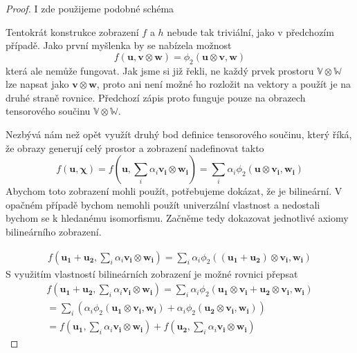 \documentclass[a5paper,12pt]{amsbook}
\theoremstyle{definition}
\newcommand{\myvec}[1]{\mathbf{#1}}
\newcommand{\myspace}[1]{\mathbb{#1}}
\begin{document}
\begin{proof}
I zde použijeme podobné schéma
\begin{center}

\end{center}
Tentokrát konstrukce zobrazení $f$ a $h$ nebude tak triviální, jako v předchozím případě.
Jako první myšlenka by se nabízela možnost
\begin{equation*}
f(\myvec{u}, \myvec{v}\otimes\myvec{w}) = \phi_2(\myvec{u}\otimes\myvec{v}, \myvec{w})
\end{equation*}
která ale nemůže fungovat. Jak jsme si již řekli, ne každý prvek prostoru $\myspace{V}\otimes\myspace{W}$
lze napsat jako $\myvec{v}\otimes\myvec{w}$, proto ani není možné ho rozložit na vektory
a použít je na druhé straně rovnice. Předchozí zápis proto funguje pouze na obrazech
tensorového součinu $\myspace{V}\otimes\myspace{W}$.

Nezbývá nám než opět využít druhý bod definice tensorového součinu, který říká, že obrazy
generují celý prostor a zobrazení nadefinovat takto
\begin{equation*}
f(\myvec{u}, \myvec{\chi}) = f(\myvec{u}, \sum_{i}\alpha_i\myvec{v_i}\otimes\myvec{w_i}) 
  = \sum_{i}\alpha_i\phi_2(\myvec{u}\otimes\myvec{v_i}, \myvec{w_i})
\end{equation*}
Abychom toto zobrazení mohli použít, potřebujeme dokázat, že je bilineární. V opačném
případě bychom nemohli použít univerzální vlastnost a nedostali bychom se k hledanému
isomorfismu. Začněme tedy dokazovat jednotlivé axiomy bilineárního zobrazení.

\begin{equation*}
\begin{split}
f(\myvec{u_1} + \myvec{u_2}, \sum_{i}\alpha_i\myvec{v_i}\otimes\myvec{w_i})
  = \sum_{i}\alpha_i\phi_2((\myvec{u_1} + \myvec{u_2})\otimes\myvec{v_i}, \myvec{w_i})
\end{split}
\end{equation*}
S využitím vlastností bilineárních zobrazení je možné rovnici přepsat
\begin{equation*}
\begin{split}
f(\myvec{u_1} + \myvec{u_2}, \sum_{i}\alpha_i\myvec{v_i}\otimes\myvec{w_i})
= \sum_{i}\alpha_i\phi_2(\myvec{u_1}\otimes\myvec{v_i} + \myvec{u_2}\otimes\myvec{v_i}, \myvec{w_i}) \\
= \sum_{i}\left(\alpha_i\phi_2(\myvec{u_1}\otimes\myvec{v_i}, \myvec{w_i}) 
   + \alpha_i\phi_2(\myvec{u_2}\otimes\myvec{v_i}, \myvec{w_i})\right) \\
= f(\myvec{u_1}, \sum_{i}\alpha_i\myvec{v_i}\otimes\myvec{w_i}) 
   + f(\myvec{u_2}, \sum_{i}\alpha_i\myvec{v_i}\otimes\myvec{w_i})
\end{split}
\end{equation*}


\end{proof}
\end{document}
